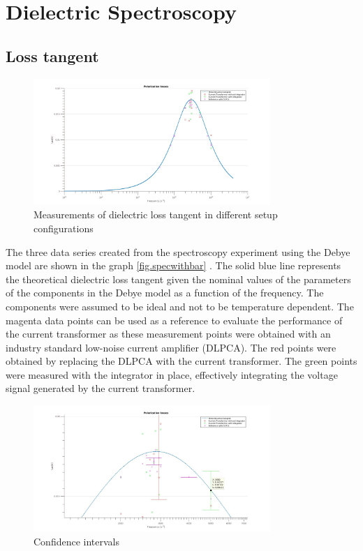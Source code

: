 \section{Dielectric Spectroscopy}
\subsection{Loss tangent}
\begin{figure}[htbp]
  \centering
  \centerline{\includegraphics[width=0.8\textwidth]{figures/Results/Spectroscopy/spectroscopywithoutbars}}
  \caption[Kurze Abbildungsbeschreibung]{Measurements of dielectric loss tangent in different setup configurations}
\label{fig.specwithbar}
  \label{fig.spectroscopy}

\end{figure}
The three data series created from the spectroscopy experiment using the Debye model are shown in the graph \ref{fig.specwithbar} . The solid blue line represents the theoretical  dielectric loss tangent given the nominal values of the parameters of the components in the Debye model
as a function of the frequency.
The components were assumed to be ideal and not to be temperature dependent.
The magenta data points can be used as a reference to evaluate the performance of the current transformer as these measurement points
were obtained with an industry standard low-noise current amplifier (DLPCA). 
The red points were obtained by replacing the DLPCA with the current transformer.
The green points were measured with the integrator in place, effectively integrating the voltage signal generated by the current transformer.

\begin{figure}[htbp]
 \centering
 \centerline{\includegraphics[width=0.8\textwidth]{figures/Results/Spectroscopy/errorbarsbettercolor}}

\caption[Kurze Abbildungsbeschreibung]{Confidence intervals}
\label{fig.spectroscopy2}
\end{figure}

